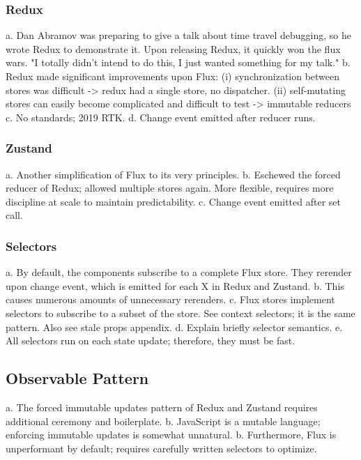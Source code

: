 \documentclass{article}
\begin{document}
\subsubsection{Redux}

a. Dan Abramov was preparing to give a talk about time travel debugging, so he wrote Redux to demonstrate it. Upon releasing Redux, it quickly won the flux wars. "I totally didn't intend to do this, I just wanted something for my talk."
b. Redux made significant improvements upon Flux: (i) synchronization between stores was difficult -> redux had a single store, no dispatcher. (ii) self-mutating stores can easily become complicated and difficult to test -> immutable reducers
c. No standards; 2019 RTK.
d. Change event emitted after reducer runs.

\subsubsection{Zustand}

a. Another simplification of Flux to its very principles.
b. Eschewed the forced reducer of Redux; allowed multiple stores again. More flexible, requires more discipline at scale to maintain predictability.
c. Change event emitted after set call.

\subsubsection{Selectors}

a. By default, the components subscribe to a complete Flux store. They rerender upon change event, which is emitted for each X in Redux and Zustand.
b. This causes numerous amounts of unnecessary rerenders.
c. Flux stores implement selectors to subscribe to a subset of the store. See context selectors; it is the same pattern. Also see stale props appendix.
d. Explain briefly selector semantics.
e. All selectors run on each state update; therefore, they must be fast.

\subsection{Observable Pattern}

a. The forced immutable updates pattern of Redux and Zustand requires additional ceremony and boilerplate.
b. JavaScript is a mutable language; enforcing immutable updates is somewhat unnatural.
b. Furthermore, Flux is unperformant by default; requires carefully written selectors to optimize.
\end{document}
